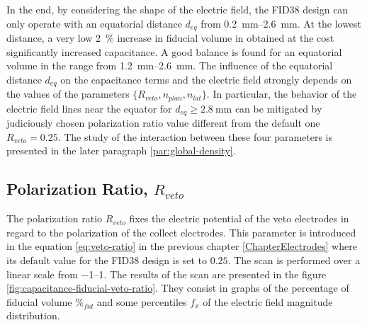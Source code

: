 In the end, by considering the shape of the electric field, the FID38 design can only operate with an equatorial distance $d_{eq}$ from \SIrange{0.2}{2.6}{\mm}. At the lowest distance, a very low \SI{2}{\percent} increase in fiducial volume in obtained at the cost significantly increased capacitance. A good balance is found for an equatorial volume in the range from \SIrange{1.2}{2.6}{\mm}.
The influence of the equatorial distance $d_{eq}$ on the capacitance terms and the electric field strongly depends on the values of the parameters $\{R_{veto}, n_{plan}, n_{lat} \}$. In particular, the behavior of the electric field lines near the equator for $d_{eq} \geq \SI{2.8}{\mm}$ can be mitigated by  judiciously chosen polarization ratio value different from the default one $R_{veto} = \num{0.25}$. The study of the interaction between these four parameters is presented in the later paragraph \ref{par:global-density}.



\subsection{Polarization Ratio, $R_{veto}$}
\label{par:veto-ratio}

The polarization ratio $R_{veto}$ fixes the electric potential of the veto electrodes in regard to the polarization of the collect electrodes. This parameter is introduced in the equation \ref{eq:veto-ratio} in the previous chapter \ref{ChapterElectrodes} where its default value for the FID38 design is set to $0.25$. The scan is performed over a linear scale from \SIrange{-1}{1}{}. The results of the scan are presented in the figure \ref{fig:capacitance-fiducial-veto-ratio}. They consist in graphs of the percentage of fiducial volume $\%_{fid}$ and some percentiles $f_x$ of the electric field magnitude distribution. 

